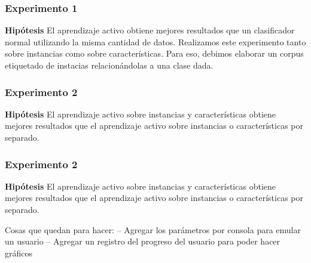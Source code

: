 \subsubsection{Experimento 1}
\textbf{Hipótesis} El aprendizaje activo obtiene mejores resultados que un clasificador normal utilizando la misma cantidad de datos.
Realizamos este experimento tanto sobre instancias como sobre características. Para eso, debimos elaborar un corpus etiquetado de instacias relacionándolas a una clase dada.

\subsubsection{Experimento 2}
\textbf{Hipótesis} El aprendizaje activo sobre instancias y características obtiene mejores resultados que el aprendizaje activo sobre instancias o características por separado.

\subsubsection{Experimento 2}
\textbf{Hipótesis} El aprendizaje activo sobre instancias y características obtiene mejores resultados que el aprendizaje activo sobre instancias o características por separado.



Cosas que quedan para hacer:
	-- Agregar los parámetros por consola para emular un usuario
	-- Agregar un registro del progreso del usuario para poder hacer gráficos
